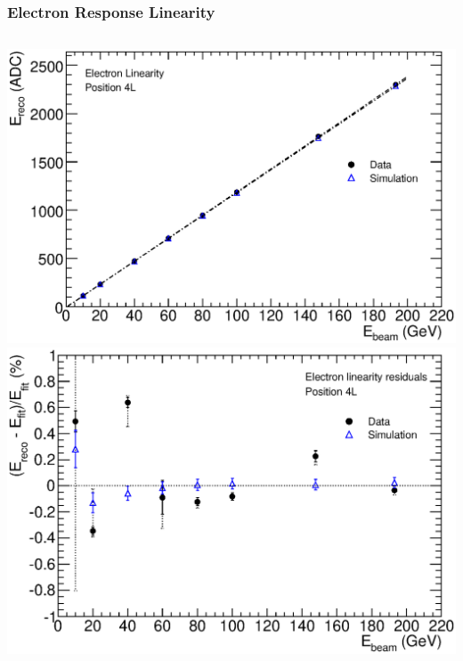 \documentclass[10pt]{beamer}
\begin{document}
\begin{frame}\frametitle{Electron Response Linearity}
\begin{columns}
\includegraphics[width=0.95\linewidth,angle=0]{FCalTB_plots/electron_linearity_4L.eps}
\includegraphics[width=0.95\linewidth,angle=0]{FCalTB_plots/electron_linearity_residuals_4L.eps}
\end{columns}


\end{frame}
\end{document}

